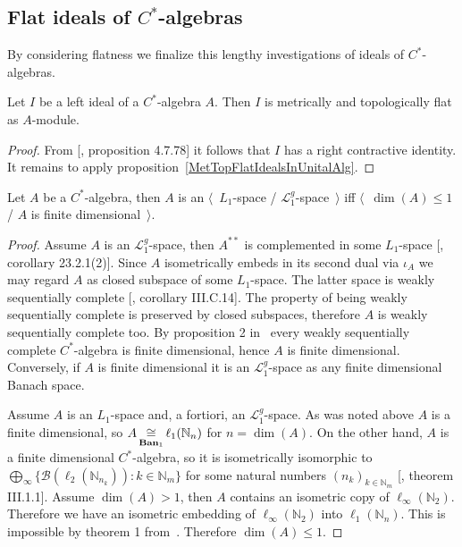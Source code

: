 
\subsection{
    Flat ideals of \texorpdfstring{$C^*$}{C*}-algebras
}\label{SubSectionFlatIdealsOfCStarAlgebras}

By considering flatness we finalize this lengthy investigations of ideals of
$C^*$-algebras.

\begin{proposition}\label{IdealofCstarAlgisMetTopFlat} Let $I$ be a left ideal
of a $C^*$-algebra $A$. Then $I$ is metrically and topologically flat as
$A$-module.
\end{proposition}
\begin{proof} From [\cite{HelBanLocConvAlg}, proposition 4.7.78] it follows that
$I$ has a right contractive identity. It remains to apply
proposition~\ref{MetTopFlatIdealsInUnitalAlg}.
\end{proof}

\begin{proposition}\label{CStarAlgIsL1IfFinDim} Let $A$ be a $C^*$-algebra, then
$A$ is an $\langle$~$L_1$-space / $\mathscr{L}_1^g$-space~$\rangle$ iff
$\langle$~$\operatorname{dim}(A)\leq 1$ / $A$ is finite dimensional~$\rangle$.
\end{proposition}
\begin{proof} Assume $A$ is an $\mathscr{L}_1^g$-space, then $A^{**}$ is
complemented in some $L_1$-space [\cite{DefFloTensNorOpId}, corollary
23.2.1(2)]. Since $A$ isometrically embeds in its second dual via $\iota_{A}$ we
may regard $A$ as closed subspace of some $L_1$-space. The latter space is
weakly sequentially complete [\cite{WojBanSpForAnalysts}, corollary III.C.14].
The property of being weakly sequentially complete is preserved by closed
subspaces, therefore $A$ is weakly sequentially complete too. By proposition 2
in~\cite{SakWeakCompOpOnOpAlg} every weakly sequentially complete $C^*$-algebra
is finite dimensional, hence $A$ is finite dimensional. Conversely, if $A$ is
finite dimensional it is an $\mathscr{L}_1^g$-space as any finite dimensional
Banach space.

Assume $A$ is an $L_1$-space and, a fortiori, an $\mathscr{L}_1^g$-space. As was
noted above $A$ is a finite dimensional, so
$A\mathop{\mathbin{\cong}}\limits_{\mathbf{Ban}_1}\ell_1(\mathbb{N}_n)$ for $n=\operatorname{dim}(A)$. On
the other hand, $A$ is a finite dimensional $C^*$-algebra, so it is
isometrically isomorphic to $\bigoplus_\infty \{
\mathcal{B}(\ell_2(\mathbb{N}_{n_k})):k\in\mathbb{N}_m \}$ for some natural
numbers ${(n_k)}_{k\in\mathbb{N}_m}$ 
[\cite{DavCSatrAlgByExmpl}, theorem III.1.1].
Assume $\operatorname{dim}(A)>1$, then $A$ contains an isometric copy of
$\ell_\infty(\mathbb{N}_2)$. Therefore we have an isometric embedding of
$\ell_\infty(\mathbb{N}_2)$ into $\ell_1(\mathbb{N}_n)$. This is impossible by
theorem 1 from~\cite{LyubIsomEmdbFinDimLp}. 
Therefore $\operatorname{dim}(A)\leq 1$. 
\end{proof}

